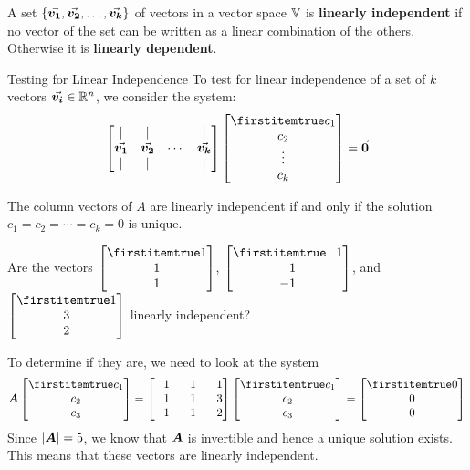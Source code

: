 \documentclass{beamer}
\begin{document}
\begin{frame}
\begin{definition}
A set $\left\{{\vec{\boldsymbol{v_1}}},{\vec{\boldsymbol{v_2}}},\dots,{\vec{\boldsymbol{v_k}}}\right\}$ of vectors in a vector space $\mathbb{V}$ is \textbf{linearly independent} if no vector of the set can be written as a linear combination of the others. Otherwise it is \textbf{linearly dependent}.
\end{definition}\pause
\begin{block}{Testing for Linear Independence}
To test for linear independence of a set of $k$ vectors ${\vec{\boldsymbol{v_i}}}\in\mathbb{R}^n$, we consider the system:
\begin{equation*}
\begin{bmatrix}
\mid       & \mid       &       & \mid       \\
\vect{v_1} & \vect{v_2} & \cdots & \vect{v_k} \\
\mid       & \mid       &       & \mid       \\
\end{bmatrix}
\bvector{c_1,c_2,\vdots,c_k}=\vect{0}
\end{equation*}

The column vectors of $A$ are linearly independent if and only if the solution $c_1=c_2=\cdots=c_k=0$ is unique.
\end{block}
\end{frame}

\begin{frame}
\begin{example}
Are the vectors $\bvector{1,1,1}$, $\bvector{\+1,\+1, -1}$, and $\bvector{1,3,2}$ linearly independent?\pause

To determine if they are, we need to look at the system
\begin{equation*}
\mat{A}\bvector{c_1,c_2,c_3}=
\begin{bmatrix}
\+1 & \+1 & \+1 \\
\+1 & \+1 & \+3 \\
\+1 &  -1 & \+2 \\
\end{bmatrix}
\bvector{c_1,c_2,c_3}=\bvector{0,0,0}
\end{equation*}\pause
Since ${\left\lvert \boldsymbol{A}\right\rvert}=5$, we know that $\boldsymbol{A}$ is invertible and hence a unique solution exists. This means that these vectors are linearly independent.
\end{example}
\end{frame}
\end{document}
